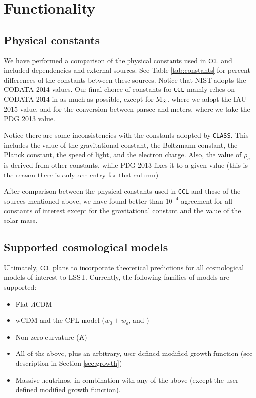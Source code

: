 \documentclass[\docopts]{\docclass}
\newcommand{\ccl}{{\tt CCL}\xspace}
\begin{document}
\section{Functionality}
\label{sec:func}

\subsection{Physical constants}

\label{sec:constants}
We have performed a comparison of the physical constants used in \ccl and included dependencies and external sources. See Table \ref{tab:constants} for percent differences of the constants between these sources. Notice that NIST adopts the CODATA 2014 values. Our final choice of constants for \ccl mainly relies on CODATA 2014 in as much as possible, except for ${\rm M}_\odot$, where we adopt the IAU 2015 value, and for the conversion between parsec and meters, where we take the PDG 2013 value.

Notice there are some inconsistencies with the constants adopted by {\tt CLASS}. This includes the value of the gravitational constant, the Boltzmann constant, the Planck constant, the speed of light, and the electron charge. Also, the value of $\rho_c$ is derived from other constants, while PDG 2013 fixes it to a given value (this is the reason there is only one entry for that column).

After comparison between the physical constants used in \ccl and those of the sources mentioned above, we have found better than $10^{−4}$ agreement for all constants of interest except for the gravitational constant and the value of the solar mass. 














\subsection{Supported cosmological models}

\label{sec:cosmologies}
Ultimately, \ccl plans to incorporate theoretical predictions for all cosmological models of interest to LSST. Currently, the following families of models are supported:
\begin{itemize}
 \item Flat $\Lambda$CDM
 \item wCDM and the CPL model ($w_0+w_a$, \citealt{Chevallier01} and \citealt{Linder03})
 \item Non-zero curvature ($K$)
 \item All of the above, plus an arbitrary, user-defined modified growth function (see description in Section \ref{sec:growth})
  \item Massive neutrinos, in combination with any of the above (except the user-defined modified growth function).
\end{itemize}
\end{document}
